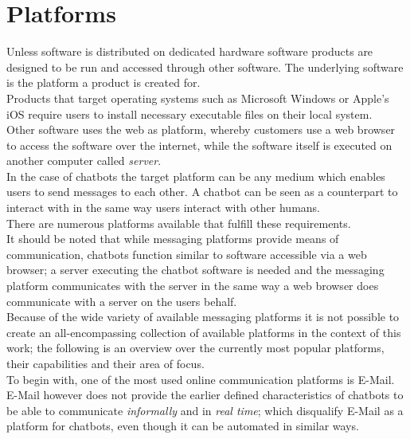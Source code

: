 \section{Platforms}


Unless software is distributed on dedicated hardware software products are designed to be run and accessed through other software. The underlying software is the platform a product is created for.
\\
Products that target operating systems such as Microsoft Windows or Apple's iOS require users to install necessary executable files on their local system.
\\
Other software uses the web as platform, whereby customers use a web browser to access the software over the internet, while the software itself is executed on another computer called \emph{server}.
\\

In the case of chatbots the target platform can be any medium which enables users to send messages to each other. A chatbot can be seen as a counterpart to interact with in the same way users interact with other humans.
\\

There are numerous platforms available that fulfill these requirements.
\\

It should be noted that while messaging platforms provide means of communication, chatbots function similar to software accessible via a web browser; a server executing the chatbot software is needed and the messaging platform communicates with the server in the same way a web browser does communicate with a server on the users behalf.
\\

Because of the wide variety of available messaging platforms it is not possible to create an all-encompassing collection of available platforms in the context of this work; the following is an overview over the currently most popular platforms, their capabilities and their area of focus.
\\

To begin with, one of the most used online communication platforms is E-Mail.
\\
E-Mail however does not provide the earlier defined characteristics of chatbots to be able to communicate \emph{informally} and in \emph{real time}; which disqualify E-Mail as a platform for chatbots, even though it can be automated in similar ways.
\\

